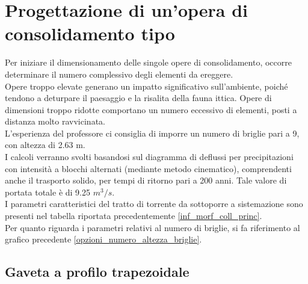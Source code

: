 \section{Progettazione di un'opera di consolidamento tipo}
Per iniziare il dimensionamento delle singole opere di consolidamento, occorre determinare il numero complessivo degli elementi da ereggere.\\
Opere troppo elevate generano un impatto significativo sull'ambiente, poiché tendono a deturpare il paesaggio e la risalita della fauna ittica. Opere di dimensioni troppo ridotte comportano un numero eccessivo di elementi, posti a distanza molto ravvicinata.\\
L'esperienza del professore ci consiglia di imporre un numero di briglie pari a 9, con altezza di 2.63 m.\\
I calcoli verranno svolti basandosi sul diagramma di deflussi per precipitazioni con intensità a blocchi alternati (mediante metodo cinematico), comprendenti anche il trasporto solido, per tempi di ritorno pari a 200 anni. Tale valore di portata totale è di 9.25 $m^3/s$.\\
I parametri caratteristici del tratto di torrente da sottoporre a sistemazione sono presenti nel tabella riportata precedentemente \ref{inf_morf_coll_princ}.\\
Per quanto riguarda i parametri relativi al numero di briglie, si fa riferimento al grafico precedente \ref{opzioni_numero_altezza_briglie}.
\subsection{Gaveta a profilo trapezoidale}
